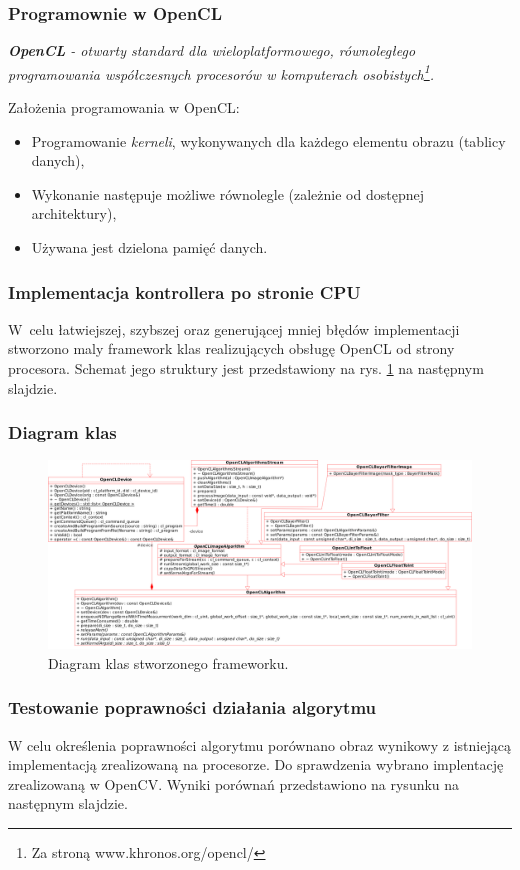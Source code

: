 \documentclass{beamer}
\begin{document}
\begin{frame}
	\frametitle{Programownie w OpenCL}
	
	\emph{\textbf{OpenCL} - otwarty standard dla wieloplatformowego, równoległego programowania współczesnych procesorów w komputerach osobistych\footnote{Za stroną www.khronos.org/opencl/}.}
	
	\vspace{1em}
	
	Założenia programowania w OpenCL:
	
	\begin{itemize}
	\item Programowanie \emph{kerneli}, wykonywanych dla każdego elementu obrazu (tablicy danych),
	\item Wykonanie następuje możliwe równolegle (zależnie od dostępnej architektury),
	\item Używana jest dzielona pamięć danych.
  \end{itemize}
\end{frame}

\begin{frame}
  \frametitle{Implementacja kontrollera po stronie CPU}
  W~celu łatwiejszej, szybszej oraz generującej mniej błędów implementacji stworzono maly framework klas realizujących obsługę OpenCL od strony procesora.
Schemat jego struktury jest przedstawiony na rys. \ref{fig:class_diagram} na następnym slajdzie.
\end{frame}

\begin{frame}
  \frametitle{Diagram klas}
\begin{figure}
  \centering
  \includegraphics[width=0.9\linewidth]{class_diagram}
  \caption{Diagram klas stworzonego frameworku.}
  \label{fig:class_diagram}
\end{figure}
  
\end{frame}

\begin{frame}
  \frametitle{Testowanie poprawności działania algorytmu}

W celu określenia poprawności algorytmu porównano obraz wynikowy z istniejącą implementacją zrealizowaną na procesorze. Do sprawdzenia wybrano implentację zrealizowaną w OpenCV. Wyniki porównań przedstawiono na rysunku na następnym slajdzie.

\end{frame}
\end{document}
